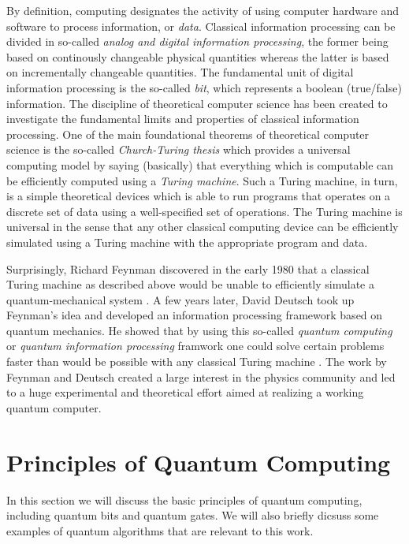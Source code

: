 By definition, computing designates the activity of using computer hardware and software to process information, or {\it data}. Classical information processing can be divided in so-called {\it analog and digital information processing}, the former being based on continously changeable physical quantities whereas the latter is based on incrementally changeable quantities. The fundamental unit of digital information processing is the so-called {\it bit}, which represents a boolean (true/false) information. The discipline of theoretical computer science has been created to investigate the fundamental limits and properties of classical information processing. One of the main foundational theorems of theoretical computer science is the so-called {\it Church-Turing thesis} which provides a universal computing model by saying (basically) that everything which is computable can be efficiently computed using a {\it Turing machine}. Such a Turing machine, in turn, is a simple theoretical devices which is able to run programs that operates on a discrete set of data using a well-specified set of operations. The Turing machine is universal in the sense that any other classical computing device can be efficiently simulated using a Turing machine with the appropriate program and data.

\smallskip

Surprisingly, Richard Feynman discovered in the early 1980 that a classical Turing machine as described above would be unable to efficiently simulate a quantum-mechanical system \citep{feynman_simulating_1982}. A few years later, David Deutsch took up Feynman's idea and developed an information processing framework based on quantum mechanics. He showed that by using this so-called {\it quantum computing} or {\it quantum information processing} framwork one could solve certain problems faster than would be possible with any classical Turing machine \citep{deutsch_quantum_1985}. The work by Feynman and Deutsch created a large interest in the physics community and led to a huge experimental and theoretical effort aimed at realizing a working quantum computer. 

\section{Principles of Quantum Computing}

In this section we will discuss the basic principles of quantum computing, including quantum bits and quantum gates. We will also briefly dicsuss some examples of quantum algorithms that are relevant to this work.

